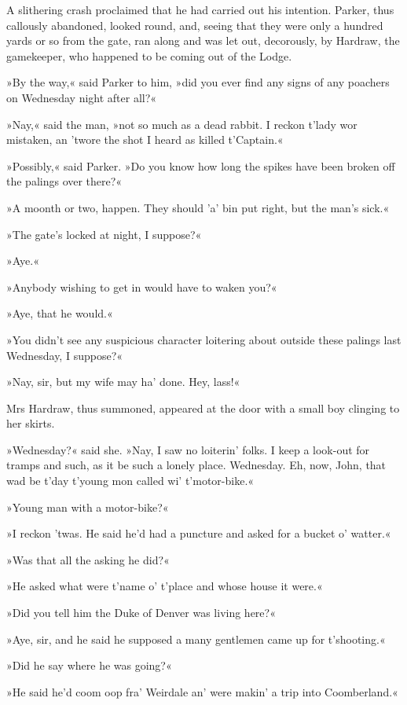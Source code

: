 A slithering crash proclaimed that he had carried out his intention.  Parker, thus callously abandoned, looked round, and, seeing that they were only a hundred yards or so from the gate, ran along and was let out, decorously, by Hardraw, the gamekeeper, who happened to be coming out of the Lodge.

»By the way,« said Parker to him, »did you ever find any signs of any poachers on Wednesday night after all?«

»Nay,« said the man, »not so much as a dead rabbit. I reckon t'lady wor mistaken, an 'twore the shot I heard as killed t'Captain.«

»Possibly,« said Parker. »Do you know how long the spikes have been broken off the palings over there?«

»A moonth or two, happen. They should 'a' bin put right, but the man's sick.«

»The gate's locked at night, I suppose?«

»Aye.«

»Anybody wishing to get in would have to waken you?«

»Aye, that he would.«

»You didn't see any suspicious character loitering about outside these palings last Wednesday, I suppose?«

»Nay, sir, but my wife may ha' done. Hey, lass!«

Mrs Hardraw, thus summoned, appeared at the door with a small boy clinging to her skirts.

»Wednesday?« said she. »Nay, I saw no loiterin' folks. I keep a look-out for tramps and such, as it be such a lonely place. Wednesday.  Eh, now, John, that wad be t'day t'young mon called wi' t'motor-bike.«

»Young man with a motor-bike?«

»I reckon 'twas. He said he'd had a puncture and asked for a bucket o' watter.«

»Was that all the asking he did?«

»He asked what were t'name o' t'place and whose house it were.«

»Did you tell him the Duke of Denver was living here?«

»Aye, sir, and he said he supposed a many gentlemen came up for t'shooting.«

»Did he say where he was going?«

»He said he'd coom oop fra' Weirdale an' were makin' a trip into Coomberland.«

